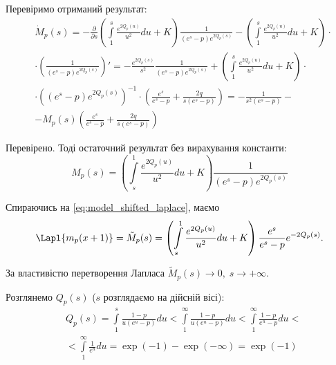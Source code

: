 Перевіримо отриманий результат:
\begin{equation*}
\begin{split}
&\dot M_{p}(s) = - \frac{\partial}{\partial s}\left( \int\limits_1^s \frac{e^{2Q_p(u)}}{u^2} du + K \right) \frac{1}{(e^s - p)  e^{2Q_p(s)}} -\left( \int\limits_1^s \frac{e^{2Q_p(u)}}{u^2} du + K \right)\cdot \\ 
&\cdot \left(\frac{1}{(e^s - p)  e^{2Q_p(s)}}\right)' = -\frac{e^{2Q_p(s)}}{s^2} \frac{1}{(e^s - p)  e^{2Q_p(s)}}  + \left( \int\limits_1^s \frac{e^{2Q_p(u)}}{u^2} du + K \right) \cdot \\
& \cdot \left((e^s - p)  e^{2Q_p(s)}\right)^{-1} \cdot \left(\frac{e^s}{e^s - p}  + \frac{2q}{s(e^s - p)}   \right)= -\frac{1}{s^2(e^s - p)} -\\
&- M_{p}(s)\left(\frac{e^s}{e^s - p}  + \frac{2q}{s(e^s - p)}   \right)
\end{split}
\end{equation*}

Перевірено. Тоді остаточний результат без вирахування константи:
\begin{equation}
\label{eq:model_laplace_sol_initial}
M_p(s)= \left( \int\limits_s^1 \frac{e^{2Q_p(u)}}{u^2} du + K \right) \frac{1}{(e^s - p)  e^{2Q_p(s)}}
\end{equation}

Спираючись на \eqref{eq:model_shifted_laplace}, маємо
\begin{equation}
\Lapl{m_p(x+1)} =\tilde M_p(s)= \left( \int\limits_s^1 \frac{e^{2Q_p(u)}}{u^2} du + K \right) \frac{e^s}{e^s - p} e^{- 2Q_p(s)}.
\end{equation}

За властивістю перетворення Лапласа $\tilde M_p(s) \rightarrow 0,\; s \rightarrow +\infty$. 

Розглянемо $Q_p(s)$ ($s$ розглядаємо на дійсній вісі):
\begin{equation}
\begin{split}
\label{eq:q_p_s_major}
&Q_p(s) = \int\limits_1^s \frac{1-p}{u(e^u - p)} du <  \int\limits_1^\infty \frac{1 - p}{u(e^u - p)} du < 
\int\limits_1^\infty \frac{1- p}{e^u - p} du<\\
&< \int\limits_1^\infty \frac{1}{e^u} du = \exp(-1) - \exp(-\infty) = \exp(-1)
\end{split}
\end{equation}

